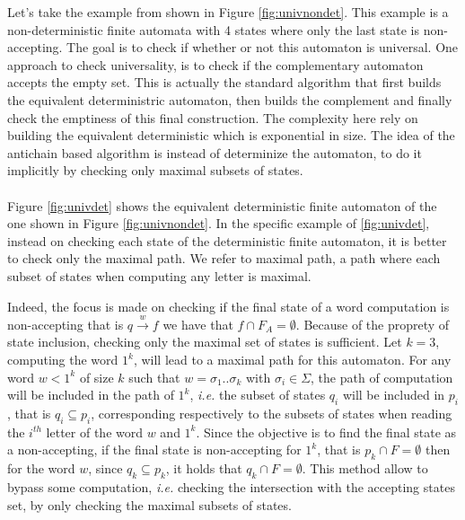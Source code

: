 \documentclass[11pt,a4paper]{article}
\theoremstyle{definition}
\begin{document}
Let's take the example from \cite{AC_universality}
shown in Figure \ref{fig:univnondet}. This example is a
non-deterministic finite automata with 4 states where
only the last state is non-accepting.
The goal is to check
if whether or not this automaton is universal.
One approach to check universality, is to check if the
complementary automaton accepts the empty set.
This is actually the standard algorithm that first builds
the equivalent deterministric automaton, then builds the complement
and finally check the emptiness of this final construction.
The complexity here rely on building the equivalent deterministic
which is exponential in size. The idea of the antichain based
algorithm is instead of determinize the automaton, to
do it implicitly by checking only maximal subsets of states.

\paragraph{}

Figure \ref{fig:univdet} shows the equivalent deterministic finite
automaton of the one
shown in Figure \ref{fig:univnondet}.
In the specific example of \ref{fig:univdet}, instead on checking
each state of the deterministic finite automaton, it is
better to check only the maximal path.
We refer to maximal path, a path where each subset of states
when computing any letter is maximal.


Indeed, the focus
is made on checking if the final state of a word computation is
non-accepting that is $q \xrightarrow{w} f$ we have that
 $f \cap F_A = \emptyset$.
Because of the
proprety of state inclusion, checking only the
maximal set of states is sufficient. Let $k=3$, computing the word $1^k$,
will lead to a maximal path for this automaton.
For any word $w < 1^k$
of size $k$ such that $w = \sigma_1..\sigma_k$ with $\sigma_i \in \Sigma$,
the path of computation will be included in the path of $1^k$,
\textit{i.e.} the subset of states $q_i$ will be included
in $p_i$, that is $q_i \subseteq p_i$,
corresponding respectively to the subsets of states
when reading the $i^{th}$ letter of the word $w$ and $1^k$.
Since the objective is to find the final state as a non-accepting,
if the final state is non-accepting for $1^k$,
that is $p_k \cap F = \emptyset$ then for the word $w$,
since $q_k \subseteq p_k$, it holds that $q_k \cap F = \emptyset$.
This method allow to bypass some computation, \textit{i.e.}
checking the intersection with the accepting states set, by only checking
the maximal subsets of states.
\end{document}
